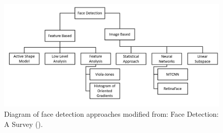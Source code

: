 \documentclass{l4proj}
\begin{document}
\begin{figure}[h!]
\centering
  \begin{minipage}{0.7\textwidth}
    \includegraphics[width=\textwidth]{images/map.png}
    \caption{Diagram of face detection approaches modified from: Face Detection: A Survey (\cite{survey}).}
    \label{map}
  \end{minipage}  
\end{figure}
\end{document}
